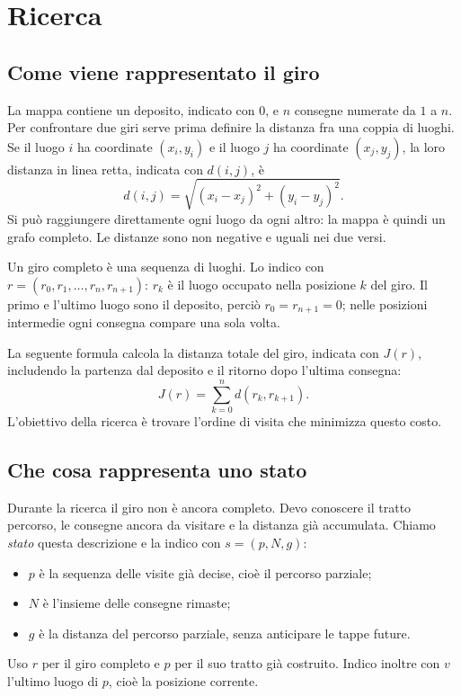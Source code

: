 \section{Ricerca}
\label{sec:search}
\subsection{Come viene rappresentato il giro}
La mappa contiene un deposito, indicato con $0$, e $n$ consegne numerate da
$1$ a $n$. Per confrontare due giri serve prima definire la distanza fra
una coppia di luoghi. Se il luogo $i$ ha coordinate $(x_i,y_i)$ e il luogo
$j$ ha coordinate $(x_j,y_j)$, la loro distanza in linea retta, indicata
con $d(i,j)$, è
\[
 d(i,j)=\sqrt{(x_i-x_j)^2+(y_i-y_j)^2}.
\]
Si può raggiungere direttamente ogni luogo da ogni altro: la mappa è quindi
un grafo completo. Le distanze sono non negative e uguali nei due versi.

Un giro completo è una sequenza di luoghi. Lo indico con
$r=(r_0,r_1,\ldots,r_n,r_{n+1})$: $r_k$ è il luogo occupato nella posizione
$k$ del giro. Il primo e
l'ultimo luogo sono il deposito, perciò $r_0=r_{n+1}=0$; nelle posizioni
intermedie ogni consegna compare una sola volta.

La seguente formula calcola la distanza totale del giro, indicata con
$J(r)$, includendo la partenza dal deposito e il ritorno dopo l'ultima consegna:
\[
 J(r)=\sum_{k=0}^{n}d(r_k,r_{k+1}).
\]
L'obiettivo della ricerca è trovare l'ordine di visita che minimizza questo costo.

\subsection{Che cosa rappresenta uno stato}
Durante la ricerca il giro non è ancora completo. Devo conoscere il tratto
percorso, le consegne ancora da visitare e la distanza già accumulata.
Chiamo \emph{stato} questa descrizione e la indico con $s=(p,N,g)$:
\begin{itemize}
\item $p$ è la sequenza delle visite già decise, cioè il percorso parziale;
\item $N$ è l'insieme delle consegne rimaste;
\item $g$ è la distanza del percorso parziale, senza anticipare le tappe future.
\end{itemize}
Uso $r$ per il giro completo e $p$ per il suo tratto già costruito.
Indico inoltre con $v$ l'ultimo luogo di $p$, cioè la posizione corrente.

